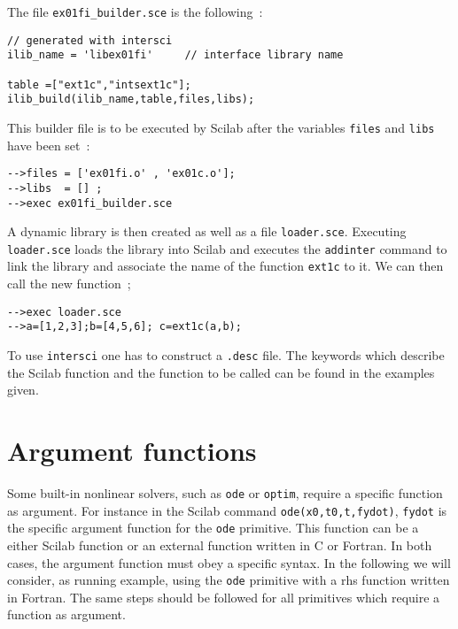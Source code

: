 The file \verb!ex01fi_builder.sce! is the following~:
\begin{verbatim}
// generated with intersci 
ilib_name = 'libex01fi'		// interface library name

table =["ext1c","intsext1c"];
ilib_build(ilib_name,table,files,libs);
\end{verbatim}

This  builder file is to be executed 
by Scilab after the variables \verb!files! and \verb!libs! have been set~:
\begin{verbatim}
-->files = ['ex01fi.o' , 'ex01c.o'];
-->libs  = [] ;
-->exec ex01fi_builder.sce
\end{verbatim}

\noindent
A dynamic library is then created as well as a file \verb!loader.sce!. 
Executing \verb!loader.sce! loads the library into Scilab and executes the
\verb!addinter! command to link the library and associate the name
of the function \verb!ext1c! to it. We can then call the new function~;
\begin{verbatim}
-->exec loader.sce
-->a=[1,2,3];b=[4,5,6]; c=ext1c(a,b);
\end{verbatim}

\noindent
To use \verb!intersci! one has to construct a \verb!.desc! file.
The keywords which describe the Scilab function and the function
to be called can be found in the examples given.

\section{Argument functions}
Some built-in nonlinear solvers, such as {\tt ode} or {\tt optim}, require a 
specific function as argument. For instance in the Scilab command
{\tt ode(x0,t0,t,fydot)}, {\tt fydot} is the specific argument function
for the {\tt ode} primitive.
This function can be a either Scilab function or an external
function written in C or Fortran.
In both cases, the argument function must obey a specific
syntax. In the following we will consider, as running example, using 
the {\tt ode} primitive with a rhs function written in Fortran. The
same steps should be followed for all primitives which require
a function as argument.

